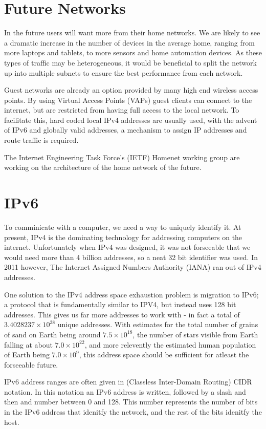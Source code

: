 \documentclass[12pt]{report}
\begin{document}
\section{Future Networks}
In the future users will want more from their home networks. We are likely to
see a dramatic increase in the number of devices in the average home, ranging
from more laptops and tablets, to more sensors and home automation devices.
As these types of traffic may be heterogeneous, it would be beneficial to split
the network up into multiple subnets to ensure the best performance from each
network. 

Guest networks are already an option provided by many high end wireless access
points. By using Virtual Access Points (VAPs) guest clients can connect to the
internet, but are restricted from having full access to the local network. To
facilitate this, hard coded local IPv4 addresses are usually used, with the
advent of IPv6 and globally valid addresses, a mechanism to assign IP addresses
and route traffic is required.  

The Internet Engineering Task Force's (IETF) Homenet working group
\cite{homenet} are working on the architecture of the home network of the
future. 

\section{IPv6}
To comminicate with a computer, we need a way to uniquely identify it. At
present, IPv4 is the dominating technology for addressing computers on the
internet. Unfortunately when IPv4 was designed, it was not forseeable that we
would need more than 4 billion addresses, so a neat 32 bit identifier was used.
In 2011 however, The Internet Assigned Numbers Authority (IANA) ran out of IPv4 
addresses. 

One solution to the IPv4 address space exhaustion problem is migration to
IPv6; a protocol that is fundamentally similar to IPV4, but instead uses 128
bit addresses. This gives us far more addresses to work with - in fact a total
of $3.4028237\times10^{38}$ unique addresses. With estimates for the total
number of grains of sand on Earth being around $7.5\times10^{18}$, the number
of stars visible from Earth falling at about $7.0\times10^{22}$, and more
relevently the estimated human population of Earth being $7.0\times10^{9}$,
this address space should be sufficient for atleast the forseeable future. 

IPv6 address ranges are often given in (Classless Inter-Domain Routing) CIDR 
notation. In this notation an IPv6 address is written, followed by a slash and then 
and number between 0 and 128. This number represents the number of bits in the IPv6 
address that idenitfy the network, and the rest of the bits idenitfy the host.
\end{document}
